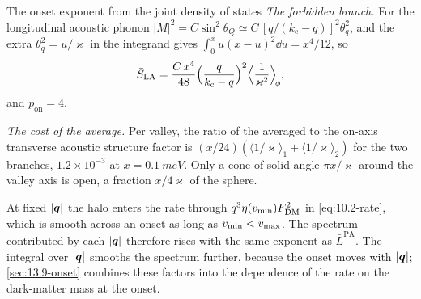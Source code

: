 \begin{workedexample}{The onset exponent from the joint density of states}
\emph{The forbidden branch.} For the longitudinal acoustic phonon $|M|^2 = C\sin^2\theta_Q \simeq C\,[q/(k_{\mathrm{c}} - q)]^2\theta_q^2$, and the extra $\theta_q^2 = u/\varkappa$ in the integrand gives $\int_0^x u(x - u)^2\dd u = x^4/12$, so
\begin{equation*}
  \bar S_{\mathrm{LA}} = \frac{C\,x^4}{48}\Bigl(\frac{q}{k_{\mathrm{c}} - q}\Bigr)^2\Bigl\langle\frac{1}{\varkappa^2}\Bigr\rangle_{\!\phi} ,
\end{equation*}
and $p_{\mathrm{on}} = 4$.

\emph{The cost of the average.} Per valley, the ratio of the averaged to the on-axis transverse acoustic structure factor is $(x/24)(\langle1/\varkappa\rangle_1 + \langle1/\varkappa\rangle_2)$ for the two branches, $1.2\times10^{-3}$ at $x = \SI{0.1}{meV}$. Only a cone of solid angle $\pi x/\varkappa$ around the valley axis is open, a fraction $x/4\varkappa$ of the sphere.
\end{workedexample}

At fixed $|\bm{q}|$ the halo enters the rate through $q^3\eta(v_{\mathrm{min}})F_{\mathrm{DM}}^2$ in \cref{eq:10.2-rate}, which is smooth across an onset as long as $v_{\mathrm{min}} < v_{\mathrm{max}}$. The spectrum contributed by each $|\bm{q}|$ therefore rises with the same exponent as $\bar L^{\mathrm{PA}}$. The integral over $|\bm{q}|$ smooths the spectrum further, because the onset moves with $|\bm{q}|$; \cref{sec:13.9-onset} combines these factors into the dependence of the rate on the dark-matter mass at the onset.
